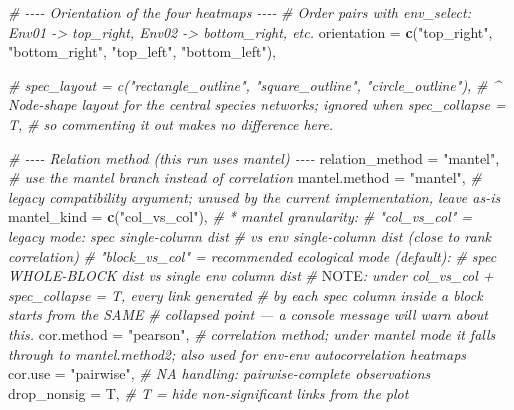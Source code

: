 \documentclass[
]{book}
\newenvironment{Shaded}{\begin{snugshade}}{\end{snugshade}}
\newcommand{\AlertTok}[1]{\textcolor[rgb]{0.94,0.16,0.16}{#1}}
\newcommand{\AttributeTok}[1]{\textcolor[rgb]{0.13,0.29,0.53}{#1}}
\newcommand{\CommentTok}[1]{\textcolor[rgb]{0.56,0.35,0.01}{\textit{#1}}}
\newcommand{\FunctionTok}[1]{\textcolor[rgb]{0.13,0.29,0.53}{\textbf{#1}}}
\newcommand{\NormalTok}[1]{#1}
\newcommand{\StringTok}[1]{\textcolor[rgb]{0.31,0.60,0.02}{#1}}
\begin{document}
\begin{Shaded}
\begin{Highlighting}[]
  \CommentTok{\# {-}{-}{-}{-} Orientation of the four heatmaps {-}{-}{-}{-}}
  \CommentTok{\# Order pairs with env\_select: Env01 {-}\textgreater{} top\_right, Env02 {-}\textgreater{} bottom\_right, etc.}
  \AttributeTok{orientation        =} \FunctionTok{c}\NormalTok{(}\StringTok{"top\_right"}\NormalTok{,}
                         \StringTok{"bottom\_right"}\NormalTok{,}
                         \StringTok{"top\_left"}\NormalTok{,}
                         \StringTok{"bottom\_left"}\NormalTok{),}

  \CommentTok{\# spec\_layout      = c("rectangle\_outline", "square\_outline", "circle\_outline"),}
  \CommentTok{\# \^{} Node{-}shape layout for the central species networks; ignored when spec\_collapse = T,}
  \CommentTok{\#   so commenting it out makes no difference here.}

  \CommentTok{\# {-}{-}{-}{-} Relation method (this run uses mantel) {-}{-}{-}{-}}
  \AttributeTok{relation\_method    =} \StringTok{"mantel"}\NormalTok{,             }\CommentTok{\# use the mantel branch instead of correlation}
  \AttributeTok{mantel.method      =} \StringTok{"mantel"}\NormalTok{,             }\CommentTok{\# legacy compatibility argument; unused by the current implementation, leave as{-}is}
  \AttributeTok{mantel\_kind        =} \FunctionTok{c}\NormalTok{(}\StringTok{"col\_vs\_col"}\NormalTok{),      }\CommentTok{\# * mantel granularity:}
                                             \CommentTok{\#   "col\_vs\_col"   = legacy mode: spec single{-}column dist}
                                             \CommentTok{\#                    vs env single{-}column dist (close to rank correlation)}
                                             \CommentTok{\#   "block\_vs\_col" = recommended ecological mode (default):}
                                             \CommentTok{\#                    spec WHOLE{-}BLOCK dist vs single env column dist}
                                             \CommentTok{\# }\AlertTok{NOTE}\CommentTok{: under col\_vs\_col + spec\_collapse = T, every link generated}
                                             \CommentTok{\#       by each spec column inside a block starts from the SAME}
                                             \CommentTok{\#       collapsed point — a console message will warn about this.}
  \AttributeTok{cor.method         =} \StringTok{"pearson"}\NormalTok{,            }\CommentTok{\# correlation method; under mantel mode it falls through to mantel.method2; also used for env{-}env autocorrelation heatmaps}
  \AttributeTok{cor.use            =} \StringTok{"pairwise"}\NormalTok{,           }\CommentTok{\# NA handling: pairwise{-}complete observations}
  \AttributeTok{drop\_nonsig        =}\NormalTok{ T,                    }\CommentTok{\# T = hide non{-}significant links from the plot}


\end{Highlighting}
\end{Shaded}
\end{document}

